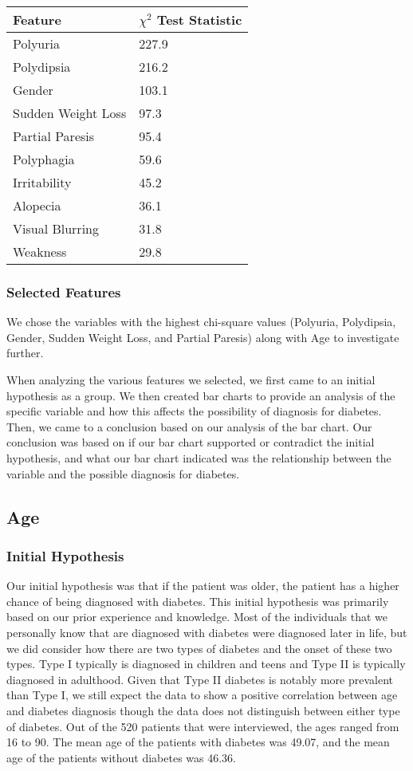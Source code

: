 \documentclass[
]{article}
\begin{document}
\begin{longtable}[]{@{}ll@{}}
\toprule
Feature & \(\chi^2\) Test Statistic\tabularnewline
\midrule
\endhead
Polyuria & 227.9\tabularnewline
Polydipsia & 216.2\tabularnewline
Gender & 103.1\tabularnewline
Sudden Weight Loss & 97.3\tabularnewline
Partial Paresis & 95.4\tabularnewline
Polyphagia & 59.6\tabularnewline
Irritability & 45.2\tabularnewline
Alopecia & 36.1\tabularnewline
Visual Blurring & 31.8\tabularnewline
Weakness & 29.8\tabularnewline
\bottomrule
\end{longtable}

\hypertarget{header-n861}{%
\subsubsection{Selected Features}\label{header-n861}}

We chose the variables with the highest chi-square values (Polyuria,
Polydipsia, Gender, Sudden Weight Loss, and Partial Paresis) along with
Age to investigate further.

When analyzing the various features we selected, we first came to an
initial hypothesis as a group. We then created bar charts to provide an
analysis of the specific variable and how this affects the possibility
of diagnosis for diabetes. Then, we came to a conclusion based on our
analysis of the bar chart. Our conclusion was based on if our bar chart
supported or contradict the initial hypothesis, and what our bar chart
indicated was the relationship between the variable and the possible
diagnosis for diabetes.

\hypertarget{header-n864}{%
\subsection{Age}\label{header-n864}}

\hypertarget{header-n865}{%
\subsubsection{Initial Hypothesis}\label{header-n865}}

Our initial hypothesis was that if the patient was older, the patient
has a higher chance of being diagnosed with diabetes. This initial
hypothesis was primarily based on our prior experience and knowledge.
Most of the individuals that we personally know that are diagnosed with
diabetes were diagnosed later in life, but we did consider how there are
two types of diabetes and the onset of these two types. Type I typically
is diagnosed in children and teens and Type II is typically diagnosed in
adulthood. Given that Type II diabetes is notably more prevalent than
Type I, we still expect the data to show a positive correlation between
age and diabetes diagnosis though the data does not distinguish between
either type of diabetes. Out of the 520 patients that were interviewed,
the ages ranged from 16 to 90. The mean age of the patients with
diabetes was 49.07, and the mean age of the patients without diabetes
was 46.36.
\end{document}
